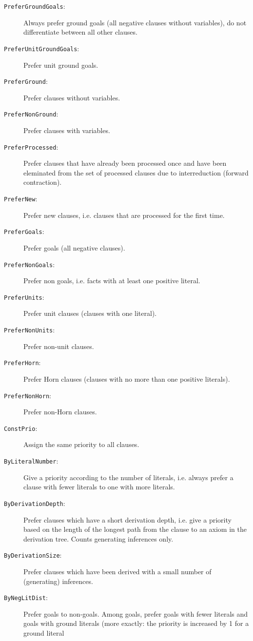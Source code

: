 \documentclass{article}
\begin{document}
\begin{description}
\item[\texttt{PreferGroundGoals}:] Always prefer ground goals (all
  negative clauses without variables), do not differentiate between
  all other clauses.
\item[\texttt{PreferUnitGroundGoals}:] Prefer unit ground goals.
\item[\texttt{PreferGround}:] Prefer clauses without variables.
\item[\texttt{PreferNonGround}:] Prefer clauses with variables.
\item[\texttt{PreferProcessed}:] Prefer clauses that have already been
  processed once and have been eleminated from the set of processed
  clauses due to interreduction (forward contraction).
\item[\texttt{PreferNew}:] Prefer new clauses, i.e. clauses that are
  processed for the first time.
\item[\texttt{PreferGoals}:] Prefer goals (all negative clauses).
\item[\texttt{PreferNonGoals}:] Prefer non goals, i.e. facts with at
  least one positive literal.
\item[\texttt{PreferUnits}:] Prefer unit clauses (clauses with one
  literal).
\item[\texttt{PreferNonUnits}:] Prefer non-unit clauses.
\item[\texttt{PreferHorn}:] Prefer Horn clauses (clauses with no more
  than one positive literals).
\item[\texttt{PreferNonHorn}:] Prefer non-Horn clauses. 
\item[\texttt{ConstPrio}:] Assign the same priority to all clauses.
\item[\texttt{ByLiteralNumber}:] Give a priority according to the
  number of literals, i.e. always prefer a clause with fewer literals
  to one with more literals.
\item[\texttt{ByDerivationDepth}:] Prefer clauses which have a short
  derivation depth, i.e. give a priority based on the length of the
  longest path from the clause to an axiom in the derivation
  tree. Counts generating inferences only.
\item[\texttt{ByDerivationSize}:] Prefer clauses which have been
  derived with a small number of (generating) inferences.
\item[\texttt{ByNegLitDist}:] Prefer goals to non-goals. Among goals,
  prefer goals with fewer literals and goals with ground literals
  (more exactly: the priority is increased by 1 for a ground literal

\end{description}
\end{document}
